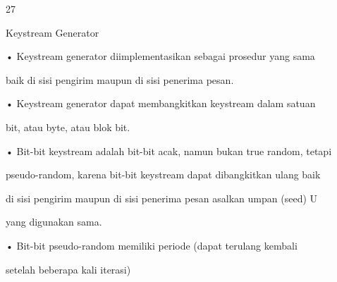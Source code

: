 \documentclass{article}
\begin{document}

27

Keystream Generator

• Keystream generator diimplementasikan sebagai prosedur yang sama 

baik di sisi pengirim maupun di sisi penerima pesan.

• Keystream generator dapat membangkitkan keystream dalam satuan 

bit, atau byte, atau blok bit. 

• Bit-bit keystream adalah bit-bit acak, namun bukan true random, tetapi 

pseudo-random, karena bit-bit keystream dapat dibangkitkan ulang baik 

di sisi pengirim maupun di sisi penerima pesan asalkan umpan (seed) U 

yang digunakan sama.  

• Bit-bit pseudo-random memiliki periode (dapat terulang kembali 

setelah beberapa kali iterasi)
\end{document}
